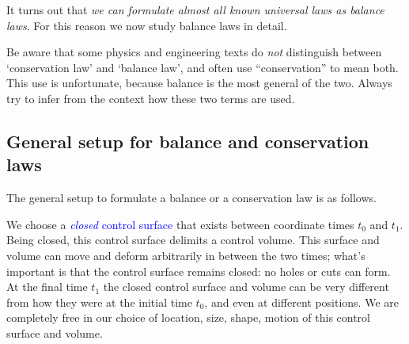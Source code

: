 \documentclass[a4paper,12pt,%
onecolumn,oneside,%
british%
]{memoir}
\renewcommand*{\|}[1][]{\nonscript\:#1\vert\nonscript\:\mathopen{}}
\newcommand*{\sect}{\S}%
\renewcommand*{\autoref}[3][\sect\,\ref]{\textcolor{blue}{#3}
\raisebox{0.6ex}{\color{blue}\miniscule%
\faIcon{angle-right}%
\;#1{#2}\;p.\,\pageref{#2}}}
\newcommand*{\yti}{t_{0}}
\newcommand*{\ytf}{t_{1}}
\begin{document}
It turns out that \emph{we can formulate almost all known universal laws as balance laws}. For this reason we now study balance laws in detail.


\begin{warning}[\enquote*{Conservation} vs \enquote*{balance} in other texts,label={wa:conservation}]
  Be aware that some physics and engineering texts do \emph{not} distinguish between \enquote*{conservation law} and \enquote*{balance law}, and often use \enquote{conservation} to mean both. This use is unfortunate, because balance is the most general of the two. Always try to infer from the context how these two terms are used.
\end{warning}

\subsection{General setup for balance and conservation laws}
\label{sec:balance_setup}

The general setup to formulate a balance or a conservation law is as follows.

We choose a \autoref{sec:in_out_flux}{\emph{closed} control surface} that exists between coordinate times $\yti$ and $\ytf$. Being closed, this control surface delimits a control volume. This surface and volume can move and deform arbitrarily in between the two times; what's important is that the control surface remains closed: no holes or cuts can form. At the final time $\ytf$ the closed control surface and volume can be very different from how they were at the initial time $\yti$, and even at different positions. We are completely free in our choice of location, size, shape, motion of this control surface and volume.
\end{document}
